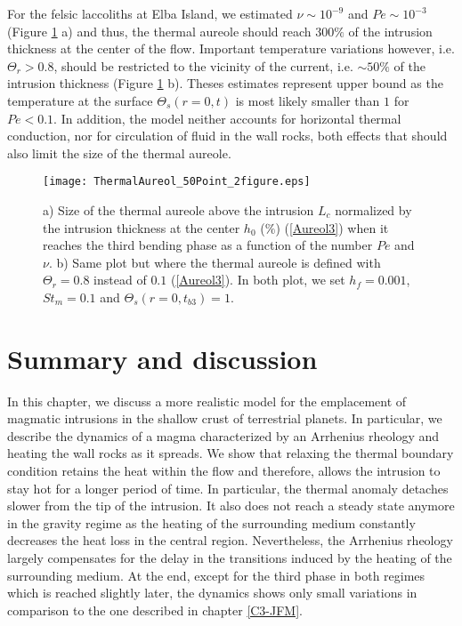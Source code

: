 For   the   felsic   laccoliths   at   Elba   Island,   we   estimated
$\nu     \sim     10^{-9}$     and    $Pe\sim     10^{-3}$     (Figure
\ref{PhaseHeatingContact}  a) and  thus,  the  thermal aureole  should
reach  $300\%$  of  the  intrusion  thickness at  the  center  of  the
flow. Important  temperature variations however,  i.e. $\Theta_r>0.8$,
should be restricted to the vicinity of the current, i.e.  $\sim 50\%$
of  the  intrusion  thickness  (Figure  \ref{PhaseHeatingContact}  b).
Theses  estimates represent  upper  bound as  the  temperature at  the
surface  $\Theta_s(r=0,t)$  is  most   likely  smaller  than  $1$  for
$Pe<0.1$.   In addition,  the  model neither  accounts for  horizontal
thermal conduction,  nor for circulation  of fluid in the  wall rocks,
both effects that should also limit the size of the thermal aureole.

\begin{figure}[h!]
  \begin{center}
    \graphicspath{ {/Users/thorey/Documents/These/Projet/Refroidissement/Skin_Model/Figure/Figure_Heating/} }
    \texttt{[image: ThermalAureol\_50Point\_2figure.eps]}
    \caption{a) Size of the thermal  aureole above the intrusion $L_c$
      normalized by the intrusion thickness at the center $h_0$ ($\%$)
      (\ref{Aureol3}) when  it reaches  the third  bending phase  as a
      function of the  number $Pe$ and $\nu$.  b) Same  plot but where
      the thermal  aureole is  defined with $\Theta_r=0.8$  instead of
      $0.1$  (\ref{Aureol3}).   In  both  plot,  we  set  $h_f=0.001$,
      $St_m=0.1$ and $\Theta_s(r=0,t_{b3})=1$.}
    \label{PhaseHeatingContact}
  \end{center}
\end{figure}


\section{Summary and discussion}
\label{sec:discussion}

In this chapter, we discuss a more realistic model for the emplacement
of magmatic intrusions in the shallow crust of terrestrial planets. In
particular, we  describe the dynamics  of a magma characterized  by an
Arrhenius rheology and heating the wall  rocks as it spreads.  We show
that relaxing the  thermal boundary condition retains  the heat within
the flow and therefore, allows the  intrusion to stay hot for a longer
period of  time.  In particular,  the thermal anomaly  detaches slower
from the tip of the intrusion.  It  also does not reach a steady state
anymore in the gravity regime as the heating of the surrounding medium
constantly   decreases  the   heat   loss  in   the  central   region.
Nevertheless, the Arrhenius rheology largely compensates for the delay
in the transitions  induced by the heating of  the surrounding medium.
At  the end,  except for  the  third phase  in both  regimes which  is
reached slightly  later, the dynamics  shows only small  variations in
comparison to the one described in chapter \ref{C3-JFM}.

